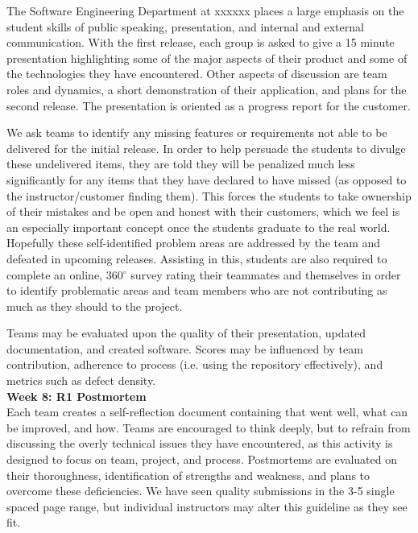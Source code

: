 \documentclass{sig-alternate}
\newif\ifisnopii
\begin{document}
The Software Engineering Department at \ifisnopii RIT \else xxxxxx \fi places a large emphasis on the student skills of public speaking, presentation, and internal and external communication. With the first release, each group is asked to give a 15 minute presentation highlighting some of the major aspects of their product and some of the technologies they have encountered. Other aspects of discussion are team roles and dynamics, a short demonstration of their application, and plans for the second release. The presentation is oriented as a progress report for the customer.

We ask teams to identify any missing features or requirements not able to be delivered for the initial release. In order to help persuade the students to divulge these undelivered items, they are told they will be penalized much less significantly for any items that they have declared to have missed (as opposed to the instructor/customer finding them). This forces the students to take ownership of their mistakes and be open and honest with their customers, which we feel is an especially important concept once the students graduate to the real world. Hopefully these self-identified problem areas are addressed by the team and defeated in upcoming releases. Assisting in this, students are also required to complete an online, 360$^{\circ}$ survey rating their teammates and themselves in order to identify problematic areas and team members who are not contributing as much as they should to the project.

Teams may be evaluated upon the quality of their presentation, updated documentation, and created software.  Scores may be influenced by team contribution, adherence to process (i.e. using the repository effectively), and metrics such as defect density.\\

\textbf{Week 8: R1 Postmortem}\\
Each team creates a self-reflection document containing that went well, what can be improved, and how. Teams are encouraged to think deeply, but to refrain from discussing the overly technical issues they have encountered, as this activity is designed to focus on team, project, and process. Postmortems are evaluated on their thoroughness, identification of strengths and weakness, and plans to overcome these deficiencies. We have seen quality submissions in the 3-5 single spaced page range, but individual instructors may alter this guideline as they see fit.\\
\end{document}
